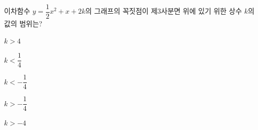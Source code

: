 이차함수 $y=\dfrac{1}{2}x^2+x+2k$의 그래프의 꼭짓점이 제$3$사분면 위에 있기 위한 상수 $k$의 값의 범위는?
\begin{choices32}{\rule[-3ex]{0pt}{8ex}$k>4$}{\rule[-3ex]{0pt}{8ex}$k<\dfrac{1}{4}$}{\rule[-3ex]{0pt}{8ex}$k<-\dfrac{1}{4}$}{\rule[-3ex]{0pt}{8ex}$k>-\dfrac{1}{4}$}{\rule[-3ex]{0pt}{8ex}$k>-4$}\end{choices32}
